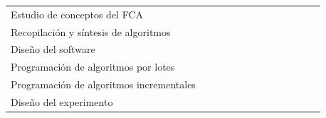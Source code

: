 \documentclass[oneside,openright,titlepage,numbers=noenddot,openany,headinclude,footinclude=true,
cleardoublepage=empty,abstractoff,BCOR=5mm,paper=a4,fontsize=12pt,main=spanish]{scrreprt}
\begin{document}
\begin{table}[H]
{\begin{tabular}{l|c|cccccclllll}
Estudio de conceptos del FCA                      &                          &                      &                          &                          & \cellcolor[HTML]{34FF34} &                          &                          &                                              &                                              &                                              &                                              &                                              \\
Recopilación y síntesis de algoritmos             &                          &                      &                          &                          & \cellcolor[HTML]{34FF34} &                          &                          &                                              &                                              &                                              &                                              &                                              \\
Diseño del software                               &                          &                      &                          &                          &                          & \cellcolor[HTML]{34FF34} &                          &                                              &                                              &                                              &                                              &                                              \\
Programación de algoritmos por lotes              &                          &                      &                          &                          &                          & \cellcolor[HTML]{34FF34} & \cellcolor[HTML]{34FF34} & \multicolumn{1}{c}{\cellcolor[HTML]{34FF34}} &                                              &                                              &                                              &                                              \\
Programación de algoritmos incrementales          &                          &                      &                          &                          &                          &                          &                          & \multicolumn{1}{c}{\cellcolor[HTML]{34FF34}} & \multicolumn{1}{c}{\cellcolor[HTML]{34FF34}} &                                              &                                              &                                              \\
Diseño del experimento                            &                          &                      &                          &                          &                          &                          &                          & \multicolumn{1}{c}{}                         & \multicolumn{1}{c}{}                         & \multicolumn{1}{c}{\cellcolor[HTML]{34FF34}} &                                              &                                              \\

\end{tabular}}
\end{table}
\end{document}
